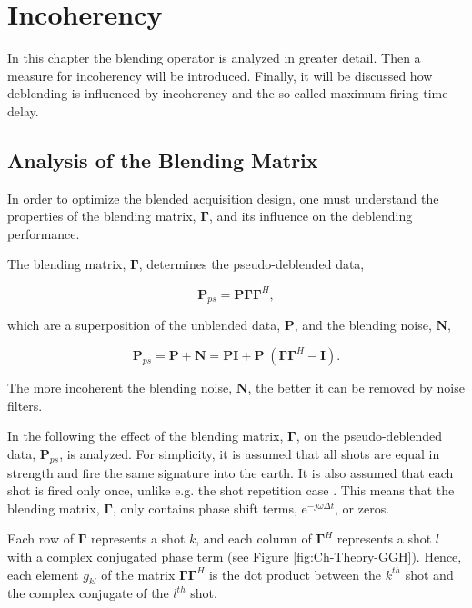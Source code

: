 \chapter{Incoherency} \label{chap:Incoherency}

In this chapter the blending operator is analyzed in greater detail. Then a measure for incoherency will be introduced. Finally, it will be discussed how deblending is influenced by incoherency and the so called maximum firing time delay.

\section{Analysis of the Blending Matrix} \label{sec:BlendingMatrix}

In order to optimize the blended acquisition design, one must understand the properties of the blending matrix, $\mathbf{\Gamma}$, and its influence on the deblending performance.

The blending matrix, $\mathbf{\Gamma}$, determines the pseudo-deblended data,

\begin{equation}
	\mathbf{P}_{ps} = \mathbf{P \Gamma \Gamma}^H,
	\label{eq:Ch-Theory-Pseudo-Deblended-Data}
\end{equation}

which are a superposition of the unblended data, $\mathbf{P}$, and the blending noise, $\mathbf{N}$,

\begin{equation}
	\mathbf{P}_{ps} = \mathbf{P} + \mathbf{N} = \mathbf{P I} + \mathbf{P} \; (\mathbf{\Gamma \Gamma}^H - \mathbf{I}).
	\label{eq:Ch-Theory-PseudoSuperposition}
\end{equation}

The more incoherent the blending noise, $\mathbf{N}$, the better it can be removed by noise filters.

In the following the effect of the blending matrix, $\mathbf{\Gamma}$, on the pseudo-deblended data, $\mathbf{P}_{ps}$, is analyzed. For simplicity, it is assumed that all shots are equal in strength and fire the same signature into the earth. It is also assumed that each shot is fired only once, unlike e.g. the shot repetition case \citep{Sixue}. This means that the blending matrix, $\mathbf{\Gamma}$, only contains phase shift terms, $\mathrm{e}^{-j \omega \Delta t}$, or zeros.

Each row of $\mathbf{\Gamma}$ represents a shot $k$, and each column of $\mathbf{\Gamma}^H$ represents a shot $l$ with a complex conjugated phase term (see Figure \ref{fig:Ch-Theory-GGH}). Hence, each element $g_{kl}$ of the matrix $\mathbf{\Gamma \Gamma}^H$ is the dot product between the $k^{th}$ shot and the complex conjugate of the $l^{th}$ shot.

